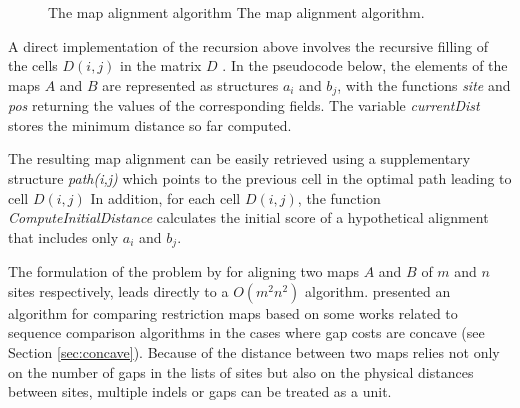 {%
\begin{figure}[t!]
\begin{center}
          {The \citeauthor{waterman:1984c} map alignment algorithm}%
          {The \citeauthor{waterman:1984c} map alignment algorithm.}%
          {}
\end{center}
\end{figure}


A direct implementation of the recursion above involves the recursive filling of the cells 
$D(i,j)$ in the matrix $D$ \citep{waterman:1984a}. In the pseudocode below, the elements of the maps 
$A$ and $B$ are represented as structures $a_i$ and $b_j$, with the functions \emph{site} and \emph{pos}
returning the values of the corresponding fields. The variable \emph{currentDist} stores the
minimum distance so far computed. 

The resulting map alignment can be easily retrieved using a supplementary structure \emph{path(i,j)} which 
points to the previous cell in the optimal path leading to cell $D(i,j)$ In addition, for each cell 
$D(i,j)$, the function \emph{ComputeInitialDistance} calculates the initial score of a hypothetical
alignment that includes only $a_i$ and $b_j$.
 


 
The formulation of the problem by \citet{waterman:1984a} for aligning two maps $A$ and $B$ 
of $m$ and $n$ sites respectively, leads directly to a $O(m^2n^2)$ algorithm. \citet{myers:1992a} 
presented an algorithm for comparing restriction maps based on some works related to sequence comparison
algorithms in the cases where gap costs are concave (see Section \ref{sec:concave}). Because of the distance between 
two maps relies not only on the number of gaps in the lists of sites but also on the physical distances 
between sites, multiple indels or gaps can be treated as a unit.

}
